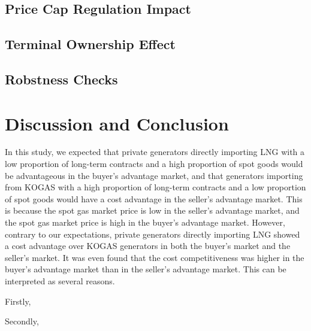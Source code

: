 \documentclass[leqno]{article}
\begin{document}
\newpage
\subsection{Price Cap Regulation Impact}


\subsection{Terminal Ownership Effect}

\newpage
\subsection{Robstness Checks}


\newpage
\section{Discussion and Conclusion}
In this study, we expected that private generators directly importing LNG with a low proportion of long-term contracts and a high proportion of spot goods would be advantageous in the buyer's advantage market, and that generators importing from KOGAS with a high proportion of long-term contracts and a low proportion of spot goods would have a cost advantage in the seller's advantage market. This is because the spot gas market price is low in the seller's advantage market, and the spot gas market price is high in the buyer's advantage market. However, contrary to our expectations, private generators directly importing LNG showed a cost advantage over KOGAS generators in both the buyer's market and the seller's market. It was even found that the cost competitiveness was higher in the buyer's advantage market than in the seller's advantage market. This can be interpreted as several reasons.

Firstly, 

Secondly, 


\newpage
\printbibliography
\end{document}
